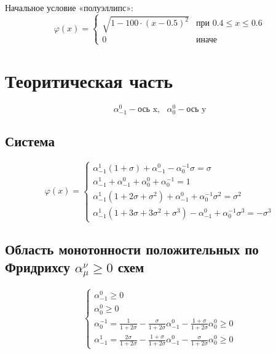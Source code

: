 \documentclass[a4paper, 12pt]{article} %
\begin{document}
Начальное условие «полуэллипс»:
\begin{equation*}
\varphi(x) = 
 \begin{cases}
   \sqrt{1 - 100 \cdot \left( x - 0.5 \right)^2} &\text{при $0.4 \leqslant x \leqslant 0.6$}\\
   0 &\text{иначе}
\end{cases}
\end{equation*}


\section{Теоритическая часть}
$$\alpha^{0}_{-1} - \text{ось x}, \,\,\,\, \alpha^{0}_{0} - \text{ось y}$$

\subsection{Система}
\begin{equation*}
\varphi(x) = 
 \begin{cases}
 	\alpha^{1}_{-1}\left(1 + \sigma \right) + \alpha^{0}_{-1} - \alpha^{-1}_{0} \sigma = \sigma  \\  
 	\alpha^{1}_{-1} + \alpha^{0}_{-1} + \alpha^{0}_{0} + \alpha^{-1}_{0}  = 1 \\
 	\alpha^{1}_{-1} \left( 1 + 2\sigma + \sigma^2 \right) + \alpha^{0}_{-1} + \alpha^{-1}_{0}\sigma^2 = \sigma^2 \\
 	\alpha^{1}_{-1} \left( 1 + 3\sigma + 3\sigma^2 + \sigma^3 \right) - \alpha^{0}_{-1} + \alpha^{-1}_{0}\sigma^3 = -\sigma^3 
 \end{cases}
\end{equation*}

\subsection{Область монотонности положительных по Фридрихсу $\alpha^\nu_\mu \geqslant 0$ схем}
\label{subsec:1t}
\begin{equation*}
 \begin{cases}
 	\alpha^{0}_{-1} \geqslant 0  \\  
 	\alpha^{0}_{0} \geqslant 0 \\
 	\alpha^{-1}_{0} = \frac{1}{1+2\sigma} - \frac{\sigma}{1 + 2\sigma}\alpha^{0}_{-1} - \frac{1 + \sigma}{1 + 2\sigma}\alpha^{0}_{0} \geqslant 0 \\
 	\alpha^{1}_{-1} = \frac{2\sigma}{1+2\sigma} - \frac{1 + \sigma}{1 + 2\sigma}\alpha^{0}_{-1} - \frac{\sigma}{1 + 2\sigma}\alpha^{0}_{0} \geqslant 0 
 \end{cases}
\end{equation*}
\end{document}
